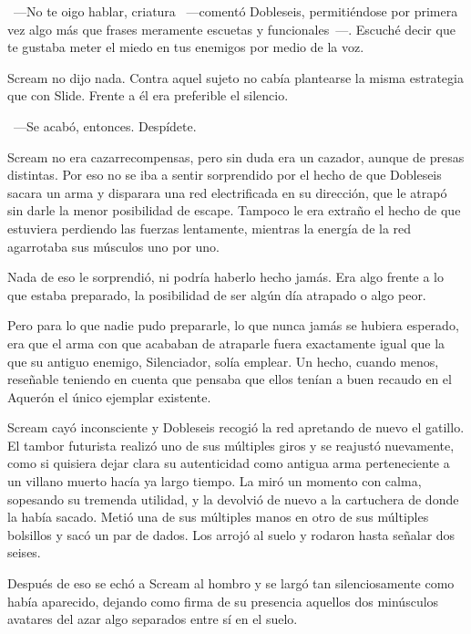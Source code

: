 ~---No te oigo hablar, criatura ~---comentó Dobleseis, permitiéndose por primera vez algo más que frases meramente escuetas y funcionales~---. Escuché decir que te gustaba meter el miedo en tus enemigos por medio de la voz.

Scream no dijo nada. Contra aquel sujeto no cabía plantearse la misma estrategia que con Slide. Frente a él era preferible el silencio.

~---Se acabó, entonces. Despídete.

Scream no era cazarrecompensas, pero sin duda era un cazador, aunque de presas distintas. Por eso no se iba a sentir sorprendido por el hecho de que Dobleseis sacara un arma y disparara una red electrificada en su dirección, que le atrapó sin darle la menor posibilidad de escape. Tampoco le era extraño el hecho de que estuviera perdiendo las fuerzas lentamente, mientras la energía de la red agarrotaba sus músculos uno por uno.

Nada de eso le sorprendió, ni podría haberlo hecho jamás. Era algo frente a lo que estaba preparado, la posibilidad de ser algún día atrapado o algo peor.

Pero para lo que nadie pudo prepararle, lo que nunca jamás se hubiera esperado, era que el arma con que acababan de atraparle fuera exactamente igual que la que su antiguo enemigo, Silenciador, solía emplear. Un hecho, cuando menos, reseñable teniendo en cuenta que pensaba que ellos tenían a buen recaudo en el Aquerón el único ejemplar existente.

Scream cayó inconsciente y Dobleseis recogió la red apretando de nuevo el gatillo. El tambor futurista realizó uno de sus múltiples giros y se reajustó nuevamente, como si quisiera dejar clara su autenticidad como antigua arma perteneciente a un villano muerto hacía ya largo tiempo. La miró un momento con calma, sopesando su tremenda utilidad, y la devolvió de nuevo a la cartuchera de donde la había sacado. Metió una de sus múltiples manos en otro de sus múltiples bolsillos y sacó un par de dados. Los arrojó al suelo y rodaron hasta señalar dos seises.

Después de eso se echó a Scream al hombro y se largó tan silenciosamente como había aparecido, dejando como firma de su presencia aquellos dos minúsculos avatares del azar algo separados entre sí en el suelo.

\endinput
